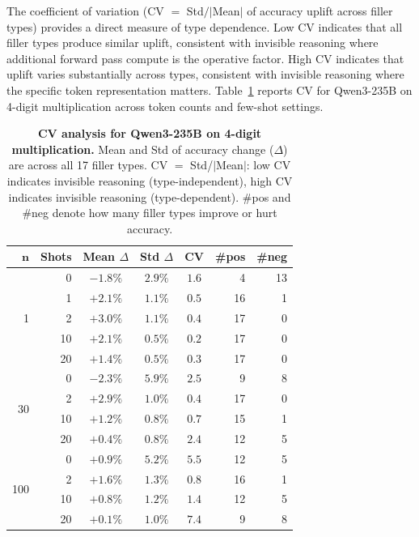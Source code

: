 \documentclass{article}
\begin{document}
The coefficient of variation (CV $=$ Std$/|$Mean$|$ of accuracy uplift across filler types) provides a direct measure of type dependence. Low CV indicates that all filler types produce similar uplift, consistent with invisible reasoning where additional forward pass compute is the operative factor. High CV indicates that uplift varies substantially across types, consistent with invisible reasoning where the specific token representation matters. Table~\ref{tab:qwen_sweep_summary} reports CV for Qwen3-235B on 4-digit multiplication across token counts and few-shot settings.

\begin{table}[h]
\centering
\caption{\textbf{CV analysis for Qwen3-235B on 4-digit multiplication.} Mean and Std of accuracy change ($\Delta$) are across all 17 filler types. CV $=$ Std/$|$Mean$|$: low CV indicates invisible reasoning (type-independent), high CV indicates invisible reasoning (type-dependent). \#pos and \#neg denote how many filler types improve or hurt accuracy.}
\label{tab:qwen_sweep_summary}
\small
{}
\begin{tabular*}{\linewidth}{@{\extracolsep{\fill}}rrcccrr@{}}
\toprule
$\boldsymbol{n}$ & \textbf{Shots} & \textbf{Mean $\Delta$} & \textbf{Std $\Delta$} & \textbf{CV} & \textbf{\#pos} & \textbf{\#neg} \\
\midrule
\multirow{5}{*}{1}
& 0  & $-1.8\%$ & $2.9\%$ & $1.6$ & 4  & 13 \\
& 1  & $+2.1\%$ & $1.1\%$ & $0.5$ & 16 & 1  \\
& 2  & $+3.0\%$ & $1.1\%$ & $0.4$ & 17 & 0  \\
& 10 & $+2.1\%$ & $0.5\%$ & $0.2$ & 17 & 0  \\
& 20 & $+1.4\%$ & $0.5\%$ & $0.3$ & 17 & 0  \\
\midrule
\multirow{4}{*}{30}
& 0  & $-2.3\%$ & $5.9\%$ & $2.5$ & 9  & 8 \\
& 2  & $+2.9\%$ & $1.0\%$ & $0.4$ & 17 & 0 \\
& 10 & $+1.2\%$ & $0.8\%$ & $0.7$ & 15 & 1 \\
& 20 & $+0.4\%$ & $0.8\%$ & $2.4$ & 12 & 5 \\
\midrule
\multirow{4}{*}{100}
& 0  & $+0.9\%$ & $5.2\%$ & $5.5$ & 12 & 5 \\
& 2  & $+1.6\%$ & $1.3\%$ & $0.8$ & 16 & 1 \\
& 10 & $+0.8\%$ & $1.2\%$ & $1.4$ & 12 & 5 \\
& 20 & $+0.1\%$ & $1.0\%$ & $7.4$ & 9  & 8 \\
\bottomrule
\end{tabular*}
\end{table}
\end{document}
